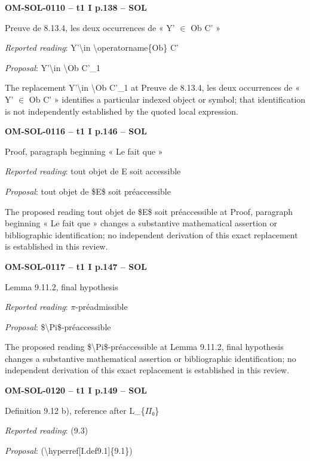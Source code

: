\par\noindent\textbf{OM-SOL-0110 -- t1 I p.138 -- SOL}\par
Preuve de 8.13.4, les deux occurrences de « Y' \ensuremath{\in} Ob C' »\par
\emph{Reported reading}: Y'\textbackslash{}in \textbackslash{}operatorname\{Ob\} C'\par
\emph{Proposal}: Y'\textbackslash{}in \textbackslash{}Ob C'\_1\par
The replacement Y'\textbackslash{}in \textbackslash{}Ob C'\_1 at Preuve de 8.13.4, les deux occurrences de « Y' \ensuremath{\in} Ob C' » identifies a particular indexed object or symbol; that identification is not independently established by the quoted local expression.\par
\par\noindent\textbf{OM-SOL-0116 -- t1 I p.146 -- SOL}\par
Proof, paragraph beginning « Le fait que »\par
\emph{Reported reading}: tout objet de E soit accessible\par
\emph{Proposal}: tout objet de \$E\$ soit préaccessible\par
The proposed reading tout objet de \$E\$ soit préaccessible at Proof, paragraph beginning « Le fait que » changes a substantive mathematical assertion or bibliographic identification; no independent derivation of this exact replacement is established in this review.\par
\par\noindent\textbf{OM-SOL-0117 -- t1 I p.147 -- SOL}\par
Lemma 9.11.2, final hypothesis\par
\emph{Reported reading}: \ensuremath{\pi}-préadmissible\par
\emph{Proposal}: \$\textbackslash{}Pi\$-préaccessible\par
The proposed reading \$\textbackslash{}Pi\$-préaccessible at Lemma 9.11.2, final hypothesis changes a substantive mathematical assertion or bibliographic identification; no independent derivation of this exact replacement is established in this review.\par
\par\noindent\textbf{OM-SOL-0120 -- t1 I p.149 -- SOL}\par
Definition 9.12 b), reference after L\_\{\ensuremath{\Pi}₀\}\par
\emph{Reported reading}: (9.3)\par
\emph{Proposal}: (\textbackslash{}hyperref[I.def9.1]\{9.1\})\par
